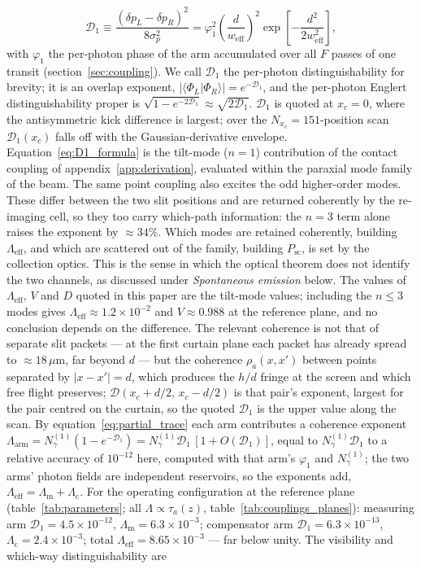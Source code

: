 \documentclass[11pt,a4paper]{article}
\newcommand{\braket}[2]{\langle #1 | #2 \rangle}
\begin{document}
\begin{equation}
\mathcal{D}_1 \equiv \frac{(\delta p_L - \delta p_R)^2}{8\sigma_p^2} = \varphi_1^2\left(\frac{d}{w_\text{eff}}\right)^2 \exp\!\left[-\frac{d^2}{2w_\text{eff}^2}\right],
\label{eq:D1_formula}
\end{equation}
with $\varphi_1$ the per-photon phase of the arm accumulated over all $F$ passes of one transit (section~\ref{sec:coupling}). We call $\mathcal{D}_1$ the per-photon distinguishability for brevity; it is an overlap exponent, $|\braket{\Phi_L}{\Phi_R}| = e^{-\mathcal{D}_1}$, and the per-photon Englert distinguishability proper is $\sqrt{1 - e^{-2\mathcal{D}_1}} \approx \sqrt{2\mathcal{D}_1}$. $\mathcal{D}_1$ is quoted at $x_c = 0$, where the antisymmetric kick difference is largest; over the $N_{x_c} = 151$-position scan $\mathcal{D}_1(x_c)$ falls off with the Gaussian-derivative envelope. Equation~\eqref{eq:D1_formula} is the tilt-mode ($n = 1$) contribution of the contact coupling of appendix~\ref{app:derivation}, evaluated within the paraxial mode family of the beam. The same point coupling also excites the odd higher-order modes. These differ between the two slit positions and are returned coherently by the re-imaging cell, so they too carry which-path information: the $n = 3$ term alone raises the exponent by $\approx 34\%$. Which modes are retained coherently, building $\Lambda_\text{eff}$, and which are scattered out of the family, building $P_\text{sc}$, is set by the collection optics. This is the sense in which the optical theorem does not identify the two channels, as discussed under \emph{Spontaneous emission} below. The values of $\Lambda_\text{eff}$, $V$ and $D$ quoted in this paper are the tilt-mode values; including the $n \leq 3$ modes gives $\Lambda_\text{eff} \approx 1.2\times 10^{-2}$ and $V \approx 0.988$ at the reference plane, and no conclusion depends on the difference. The relevant coherence is not that of separate slit packets --- at the first curtain plane each packet has already spread to $\approx 18\,\mu$m, far beyond $d$ --- but the coherence $\rho_a(x, x')$ between points separated by $|x - x'| = d$, which produces the $h/d$ fringe at the screen and which free flight preserves; $\mathcal{D}(x_c + d/2,\, x_c - d/2)$ is that pair's exponent, largest for the pair centred on the curtain, so the quoted $\mathcal{D}_1$ is the upper value along the scan. By equation~\eqref{eq:partial_trace} each arm contributes a coherence exponent $\Lambda_\text{arm} = N_\gamma^{(1)}(1 - e^{-\mathcal{D}_1}) = N_\gamma^{(1)}\mathcal{D}_1\,[1 + O(\mathcal{D}_1)]$, equal to $N_\gamma^{(1)}\mathcal{D}_1$ to a relative accuracy of $10^{-12}$ here, computed with that arm's $\varphi_1$ and $N_\gamma^{(1)}$; the two arms' photon fields are independent reservoirs, so the exponents add, $\Lambda_\text{eff} = \Lambda_\text{m} + \Lambda_\text{c}$. For the operating configuration at the reference plane (table~\ref{tab:parameters}; all $\Lambda \propto \tau_a(z)$, table~\ref{tab:couplings_planes}): measuring arm $\mathcal{D}_1 = 4.5\times 10^{-12}$, $\Lambda_\text{m} = 6.3\times 10^{-3}$; compensator arm $\mathcal{D}_1 = 6.3\times 10^{-13}$, $\Lambda_\text{c} = 2.4\times 10^{-3}$; total $\Lambda_\text{eff} = 8.65\times 10^{-3}$ --- far below unity. The visibility and which-way distinguishability are
\end{document}
